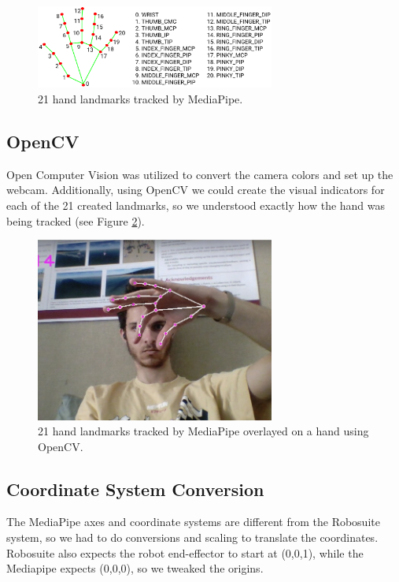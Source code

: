 \documentclass{article}
\begin{document}
\begin{figure}[H]
  \centering
  \includegraphics[width=0.7\textwidth]{hand_landmarks.png}
  \caption{21 hand landmarks tracked by MediaPipe.}
  \label{fig:hand-landmarks}
\end{figure}
\subsection{OpenCV}
Open Computer Vision was utilized to convert the camera colors and set up the
webcam. Additionally, using OpenCV we could create the visual indicators for
each of the 21 created landmarks, so we understood exactly how the hand was
being tracked (see Figure \ref{fig:hand-landmarks-webcam}).
\begin{figure}[H]
  \centering
  \includegraphics[width=0.7\textwidth]{hand-landmarks-webcam.jpeg}
  \caption{21 hand landmarks tracked by MediaPipe overlayed on a hand using OpenCV.}
  \label{fig:hand-landmarks-webcam}
\end{figure}
\subsection{Coordinate System Conversion}
The MediaPipe axes and coordinate systems are different from the Robosuite
system, so we had to do conversions and scaling to translate the coordinates.
Robosuite also expects the robot end-effector to start at (0,0,1), while the
Mediapipe expects (0,0,0), so we tweaked the origins. 
\end{document}
